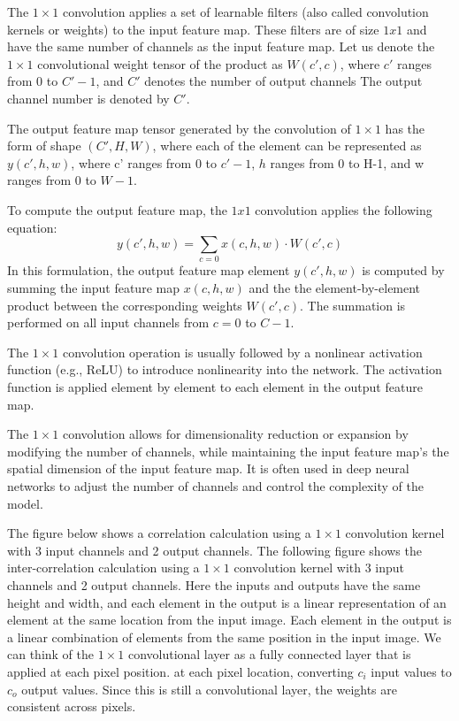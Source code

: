 \documentclass[a4paper,12pt]{article}
\begin{document}
The $1 \times 1$ convolution applies a set of learnable filters (also called convolution kernels or weights) to the input feature map.
These filters are of size $1x1$ and have the same number of channels as the input feature map. Let us denote the $1 \times 1$ convolutional
weight tensor of the product as $W(c', c)$, where $c' $ ranges from 0 to $C'-1$, and $C'$ denotes the number of output channels
The output channel number is denoted by $C'$.

The output feature map tensor generated by the convolution of $1 \times 1$ has the form of shape $(C', H, W) $, where each of the
element can be represented as $y(c', h, w)$, where c' ranges from 0 to $c'-1$, $h $ ranges from 0 to H-1, and w
ranges from $0 $ to $W-1$.

To compute the output feature map, the $1x1 $ convolution applies the following equation:
\begin{equation}
y(c', h, w) = \sum_{c=0} x(c, h, w) \cdot W(c', c)
\end{equation}
In this formulation, the output feature map element $y(c', h, w)$ is computed by summing the input feature map $x(c, h, w)$ and the
the element-by-element product between the corresponding weights $W(c', c)$. The summation is performed on all input channels from $c=0$
to $C-1$.

The $1 \times 1$ convolution operation is usually followed by a nonlinear activation function (e.g., ReLU) to introduce nonlinearity into the network.
The activation function is applied element by element to each element in the output feature map.

The $1 \times 1$ convolution allows for dimensionality reduction or expansion by modifying the number of channels, while maintaining the input feature map's
the spatial dimension of the input feature map. It is often used in deep neural networks to adjust the number of channels and control the complexity of the model.

The figure below shows a correlation calculation using a $1 \times 1$ convolution kernel with 3 input channels and 2 output channels.
The following figure shows the inter-correlation calculation using a $1 \times 1$ convolution kernel with 3 input channels and 2 output channels. Here the inputs and outputs have the same height and width, and each element in the output is a linear representation of an element at the same location from the input image.
Each element in the output is a linear combination of elements from the same position in the input image. We can think of the $1 \times 1$ convolutional layer as a fully connected layer that is applied at each pixel position.
at each pixel location, converting $c_i$ input values to $c_o$ output values. Since this is still a convolutional layer, the
weights are consistent across pixels.
\end{document}
